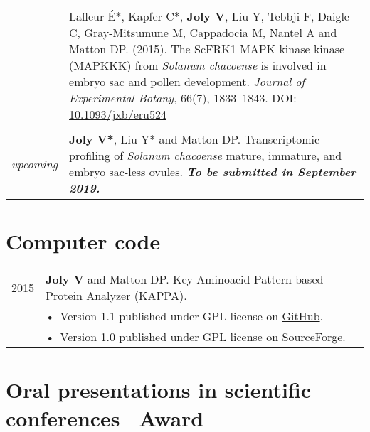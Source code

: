 \documentclass[letterpaper,12pt]{article}
\begin{document}
\begin{tabularx}{\textwidth}{@{}r|X@{}}
& Lafleur É*, Kapfer C*, \textbf{Joly V}, Liu Y, Tebbji F, Daigle C,
  Gray-Mitsumune M, Cappadocia M, Nantel A and Matton DP. (2015).
  The ScFRK1 MAPK kinase kinase (MAPKKK) from \emph{Solanum chacoense} is
  involved in embryo sac and pollen development.
  \emph{Journal of Experimental Botany}, 66(7), 1833--1843.
  DOI: \href{http://doi.org/10.1093/jxb/eru524}{10.1093/jxb/eru524}
  \\

%

\multicolumn{2}{c}{} \\

{\em upcoming}
& \textbf{Joly V*}, Liu Y* and Matton DP.
  Transcriptomic profiling of \emph{Solanum chacoense} mature, immature, and
  embryo sac-less ovules.
  {\bfseries\em To be submitted in September 2019.}
  \\

\end{tabularx}

\vspace{6mm}

\section[Computer code]{Computer code}

\begin{tabularx}{\textwidth}{@{}r|X@{}}

2015
& \textbf{Joly V} and Matton DP. Key Aminoacid Pattern-based Protein Analyzer (KAPPA). \\
& \small \hspace{1.5mm} •~Version 1.1 published under GPL license on \href{https://github.com/valentinjoly/kappa-1.1}{GitHub}. \\
& \small \hspace{1.5mm} •~Version 1.0 published under GPL license on \href{https://sourceforge.net/projects/kappa-sequence-search/}{SourceForge}.
\\

\end{tabularx}

\newpage

\section[Oral presentations]{Oral presentations
         \small in scientific conferences \hfill {\mdseries\faStar}~Award}
\end{document}
